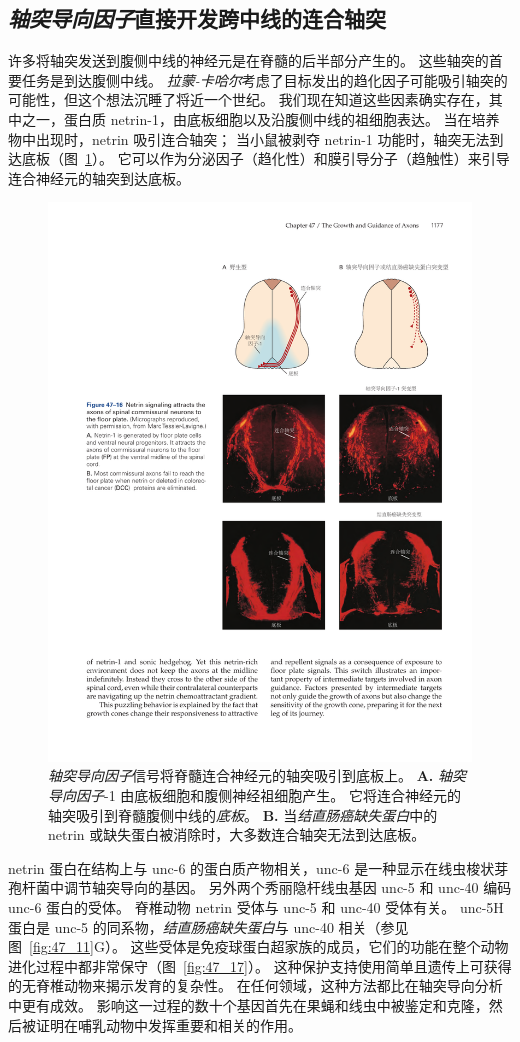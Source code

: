\subsection{\textit{轴突导向因子}直接开发跨中线的连合轴突}

许多将轴突发送到腹侧中线的神经元是在脊髓的后半部分产生的。
这些轴突的首要任务是到达腹侧中线。
\textit{拉蒙-卡哈尔}考虑了目标发出的趋化因子可能吸引轴突的可能性，但这个想法沉睡了将近一个世纪。
我们现在知道这些因素确实存在，其中之一，蛋白质 netrin-1，由底板细胞以及沿腹侧中线的祖细胞表达。
当在培养物中出现时，netrin 吸引连合轴突；
当小鼠被剥夺 netrin-1 功能时，轴突无法到达底板（图~\ref{fig:47_16}）。
它可以作为分泌因子（趋化性）和膜引导分子（趋触性）来引导连合神经元的轴突到达底板。


\begin{figure}[htbp]
	\centering
	\includegraphics[width=0.65\linewidth]{chap47/fig_47_16}
	\caption{\textit{轴突导向因子}信号将脊髓连合神经元的轴突吸引到底板上。
		\textbf{A.} \textit{轴突导向因子}-1 由底板细胞和腹侧神经祖细胞产生。
		它将连合神经元的轴突吸引到脊髓腹侧中线的\textit{底板}。
		\textbf{B.} 当\textit{结直肠癌缺失蛋白}中的 netrin 或缺失蛋白被消除时，大多数连合轴突无法到达底板。}
	\label{fig:47_16}
\end{figure}


netrin 蛋白在结构上与 unc-6 的蛋白质产物相关，unc-6 是一种显示在线虫梭状芽孢杆菌中调节轴突导向的基因。
另外两个秀丽隐杆线虫基因 unc-5 和 unc-40 编码 unc-6 蛋白的受体。
脊椎动物 netrin 受体与 unc-5 和 unc-40 受体有关。
unc-5H 蛋白是 unc-5 的同系物，\textit{结直肠癌缺失蛋白}与 unc-40 相关（参见图~\ref{fig:47_11}G）。
这些受体是免疫球蛋白超家族的成员，它们的功能在整个动物进化过程中都非常保守（图~\ref{fig:47_17}）。
这种保护支持使用简单且遗传上可获得的无脊椎动物来揭示发育的复杂性。
在任何领域，这种方法都比在轴突导向分析中更有成效。
影响这一过程的数十个基因首先在果蝇和线虫中被鉴定和克隆，然后被证明在哺乳动物中发挥重要和相关的作用。


